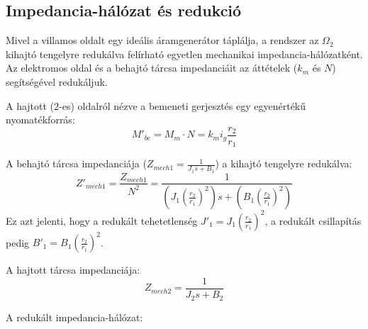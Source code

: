\subsection{Impedancia-hálózat és redukció}
Mivel a villamos oldalt egy ideális áramgenerátor táplálja, a rendszer az $\Omega_2$ kihajtó tengelyre redukálva felírható egyetlen mechanikai impedancia-hálózatként. Az elektromos oldal és a behajtó tárcsa impedanciáit az áttételek ($k_m$ és $N$) segítségével redukáljuk.

A hajtott ($2$-es) oldalról nézve a bemeneti gerjesztés egy egyenértékű nyomatékforrás:
\begin{equation}
	M'_{be} = M_m \cdot N = k_m i_g \frac{r_2}{r_1}
\end{equation}

A behajtó tárcsa impedanciája ($Z_{mech1} = \frac{1}{J_1 s + B_1}$) a kihajtó tengelyre redukálva:
\begin{equation}
	Z'_{mech1} = \frac{Z_{mech1}}{N^2} = \frac{1}{\left(J_1 \left(\frac{r_2}{r_1}\right)^2\right) s + \left(B_1 \left(\frac{r_2}{r_1}\right)^2\right)}
\end{equation}
Ez azt jelenti, hogy a redukált tehetetlenség $J'_1 = J_1 \left(\frac{r_2}{r_1}\right)^2$, a redukált csillapítás pedig $B'_1 = B_1 \left(\frac{r_2}{r_1}\right)^2$.

A hajtott tárcsa impedanciája:
\begin{equation}
	Z_{mech2} = \frac{1}{J_2 s + B_2}
\end{equation}

A redukált impedancia-hálózat:
\begin{center}
\end{center}

